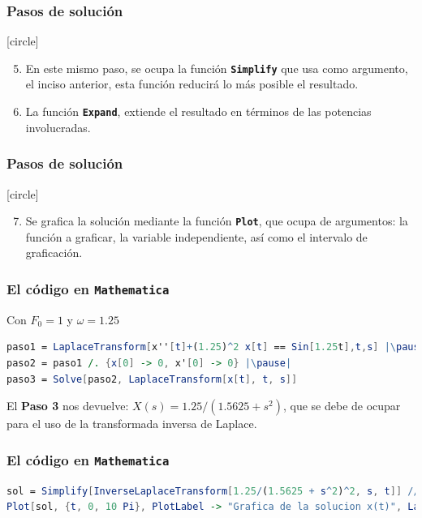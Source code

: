 \begin{frame}
\frametitle{Pasos de solución}
[circle]
\begin{enumerate}[<+->]
\setcounter{enumi}{4}
\item En este mismo paso, se ocupa la función \texttt{\textbf{Simplify}} que usa como argumento, el inciso anterior, esta función reducirá lo más posible el resultado.
\item La función \texttt{\textbf{Expand}}, extiende el resultado en términos de las potencias involucradas.
\end{enumerate}
\end{frame}
\begin{frame}
\frametitle{Pasos de solución}
[circle]
\begin{enumerate}[<+->]
\setcounter{enumi}{6}
\item Se grafica la solución mediante la función \texttt{\textbf{Plot}}, que ocupa de argumentos: la función a graficar, la variable independiente, así como el intervalo de graficación. 
\end{enumerate}
\end{frame}
\begin{frame}[fragile]
\frametitle{El código en \texttt{Mathematica}}
Con $F_{0} = 1$ y $\omega = 1.25$
\\
\bigskip
\begin{lstlisting}[language=Mathematica]
paso1 = LaplaceTransform[x''[t]+(1.25)^2 x[t] == Sin[1.25t],t,s] |\pause|
paso2 = paso1 /. {x[0] -> 0, x'[0] -> 0} |\pause|
paso3 = Solve[paso2, LaplaceTransform[x[t], t, s]]
\end{lstlisting}
\pause
El \textbf{Paso 3} nos devuelve: $X(s) = 1.25/(1.5625 + s^{2})$, que se debe de ocupar para el uso de la transformada inversa de Laplace.
\end{frame}
\begin{frame}[fragile]
\frametitle{El código en \texttt{Mathematica}}
\begin{lstlisting}[language=Mathematica]
sol = Simplify[InverseLaplaceTransform[1.25/(1.5625 + s^2)^2, s, t]] // Expand |\pause|
Plot[sol, {t, 0, 10 Pi}, PlotLabel -> "Grafica de la solucion x(t)", LabelStyle -> Directive[FontSize -> 12], PlotStyle -> {Red}]
\end{lstlisting}
\end{frame}
